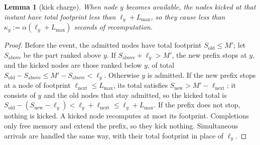 \documentclass{article}
\newtheorem{lemma}{Lemma}
\begin{document}
\begin{lemma}[kick charge]
\label{lem:kick}
When node $y$ becomes available, the nodes kicked at that instant have total footprint less than
$\ell_y + L_{\max}$, so they cause less than $\kappa_y := \alpha(\ell_y + L_{\max})$ seconds of recomputation.
\end{lemma}
\begin{proof}
Before the event, the admitted nodes have total footprint $S_{\mathrm{old}} \le M'$; let $S_{\mathrm{above}}$ be
the part ranked above $y$. If $S_{\mathrm{above}} + \ell_y > M'$, the new prefix stops at $y$, and the kicked nodes
are those ranked below $y$, of total $S_{\mathrm{old}} - S_{\mathrm{above}} \le M' - S_{\mathrm{above}} < \ell_y$.
Otherwise $y$ is admitted. If the new prefix stops at a node of footprint $\ell_{\mathrm{next}} \le L_{\max}$, its
total satisfies $S_{\mathrm{new}} > M' - \ell_{\mathrm{next}}$; it consists of $y$ and the old nodes that stay
admitted, so the kicked total is $S_{\mathrm{old}} - (S_{\mathrm{new}} - \ell_y) < \ell_y + \ell_{\mathrm{next}}
\le \ell_y + L_{\max}$. If the prefix does not stop, nothing is kicked. A kicked node recomputes at most its
footprint. Completions only free memory and extend the prefix, so they kick nothing. Simultaneous arrivals are
handled the same way, with their total footprint in place of $\ell_y$.
\end{proof}
\end{document}
